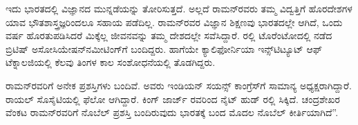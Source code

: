ಇದು ಭಾರತದಲ್ಲಿ ವಿಜ್ಞಾನದ ಮುನ್ನಡೆಯನ್ನು ತೋರಿಸುತ್ತದೆ. ಅಲ್ಲದೆ ರಾಮನ್‍ರವರು ತಮ್ಮ ವಿದ್ವತ್ತಿಗೆ ಹೊರದೇಶಗಳ ಯಾವ ಭೌತಶಾಸ್ತ್ರಜ್ಞರಿಂದಲೂ ಸಹಾಯ ಪಡೆದಿಲ್ಲ. ರಾಮನ್‍ರವರ ವಿಜ್ಞಾನ ಶಿಕ್ಷಣವು ಭಾರತದಲ್ಲೇ ಆಗಿದೆ, ಒಂದು ವರ್ಷ ಹೊರತುಪಡಿಸಿದರೆ ಮಿಕ್ಕೆಲ್ಲ ಜೀವನವನ್ನು ತಮ್ಮ ದೇಶದಲ್ಲೇ ಸವೆಸಿದ್ದಾರೆ. ರಲ್ಲಿ ಟೊರೆಂಟೋದಲ್ಲಿ ನಡೆದ ಬ್ರಿಟಿಷ್ ಅಸೋಸಿಯೇಷನ್‍ನ\break ಮೀಟಿಂಗ್‍ಗೆ ಬಂದಿದ್ದರು. ಹಾಗೆಯೇ ಕ್ಯಾಲಿಫೋರ್ನಿಯಾ ಇನ್ಸ್‌ಟಿಟ್ಯೂಟ್ ಆಫ್ ಟೆಕ್ನಾಲಜಿಯಲ್ಲಿ ಕೆಲವು ತಿಂಗಳ ಕಾಲ ಸಂಶೋಧನೆಯಲ್ಲಿ ತೊಡಗಿದ್ದರು.

ರಾಮನ್‍ರವರಿಗೆ ಅನೇಕ ಪ್ರಶಸ್ತಿಗಳು ಬಂದಿವೆ. ಅವರು ಇಂಡಿಯನ್ ಸಯನ್ಸ್ ಕಾಂಗ್ರೆಸ್‍ಗೆ ಸಾಮಾನ್ಯ ಅಧ್ಯಕ್ಷರಾಗಿದ್ದಾರೆ. ರಾಯಲ್ ಸೊಸೈಟಿಯಲ್ಲಿ ಫೆಲೋ ಆಗಿದ್ದಾರೆ. ಕಿಂಗ್ ಜಾರ್ಜ್ ರವರಿಂದ ನೈಟ್ ಹುಡ್ ರಲ್ಲಿ ಸಿಕ್ಕಿದೆ. ಚಂದ್ರಶೇಖರ ವೆಂಕಟ ರಾಮನ್‍ರವರಿಗೆ ನೊಬೆಲ್ ಪ್ರಶಸ್ತಿ ಬಂದಿರುವುದು ಭಾರತಕ್ಕೆ ಬಂದ ಮೊದಲ ನೊಬೆಲ್ ಕೀರ್ತಿಯಾಗಿದೆ”.

